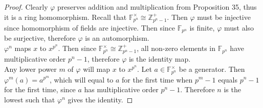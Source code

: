 \documentclass{article}
\begin{document}
  \begin{proof}
    Clearly $\varphi$ preserves addition and multiplication from
    Proposition 35, thus it is a ring homomorphism.
    Recall that $\mathbb{F}_{p^n}^\times \cong\mathbb{Z}_{p^n-1}^+$.
    Then $\varphi$ must be injective since homomorphism of fields are
    injective. Then since $\mathbb{F}_{p^n}$ is finite, $\varphi$ must also
    be surjective, therefore $\varphi$ is an automorphism. \\

    $\varphi^n$ maps $x$ to $x^{p^n}$. Then since $\mathbb{F}_{p^n}^\times
    \cong\mathbb{Z}_{p^n-1}^+$, all non-zero elements in $\mathbb{F}_{p^n}$
    have multiplicative order $p^n-1$, therefore $\varphi$ is the identity
    map. \\

    Any lower power $m$ of $\varphi$ will map $x$ to $x^{p^n}$. Let
    $a\in\mathbb{F}_{p^n}^\times$ be a generator. Then
    $\varphi^m(a)=a^{p^m}$, which will equal to $a$ for the first time when
    $p^m-1$ equals $p^n-1$ for the first time, since $a$ has multiplicative
    order $p^n-1$. Therefore $n$ is the lowest such that $\varphi^n$ gives
    the identity. 
  \end{proof}
\end{document}
